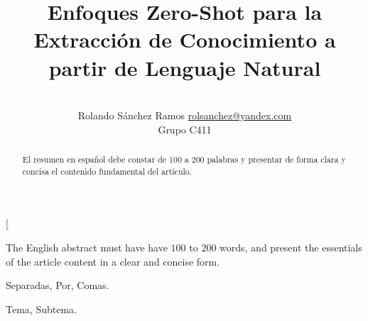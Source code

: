 \documentclass[a4paper,10pt,twocolumn]{article}
\title{Enfoques Zero-Shot para la Extracción de Conocimiento a partir de Lenguaje Natural}
\author{\\
\name Rolando S\'anchez Ramos \email \href{mailto:rolsanchez@yandex.com}{rolsanchez@yandex.com}
	\\ \addr Grupo C411}
\begin{document}
\twocolumn[

\maketitle


\begin{abstract}

	El resumen en español debe constar de $100$ a $200$ palabras y presentar de forma
	clara y concisa el contenido fundamental del artículo.

\end{abstract}

\vspace{0.5cm}

\begin{enabstract}

  The English abstract must have have $100$ to $200$ words, and present 
  the essentials of the article content in a clear and concise form.

\end{enabstract}

\begin{keywords}
	Separadas,
	Por,
	Comas.
\end{keywords}

\begin{topics}
	Tema, Subtema.
\end{topics}
\end{document}
